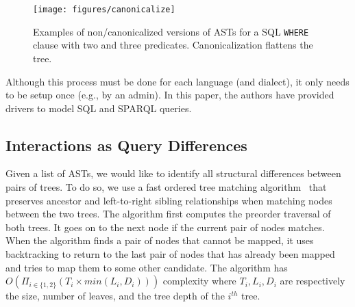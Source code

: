 \begin{figure}[b]
\centering
\texttt{[image: figures/canonicalize]}
\caption{Examples of non/canonicalized versions of ASTs for a SQL \texttt{WHERE} clause with two and three predicates. Canonicalization flattens the tree.}
\label{f:canonicalize}
\end{figure}


Although this process must be done for each language (and dialect), it only needs to be setup once (e.g., by an admin).  In this paper, the authors have provided drivers to model SQL and SPARQL queries.

\subsection{Interactions as Query Differences}
\label{sec:diff}
Given a list of ASTs, we would like to identify all structural differences
between pairs of trees.  To do so, we use a fast ordered tree matching
algorithm~\cite{bille2005survey,thomas2001introduction} that preserves ancestor
and left-to-right sibling relationships when matching nodes between the two
trees. The algorithm first computes the preorder traversal of both trees. It
goes on to the next node if the current pair of nodes matches. When the algorithm
finds a pair of nodes that cannot be mapped, it uses backtracking to return to
the last pair of nodes that has already been mapped and tries to map them to
some other candidate.  The algorithm has $O(\Pi_{i\in\{1,2\}} (T_i \times
min(L_i,D_i)))$ complexity where $T_i,L_i,D_i$ are respectively the size,
number of leaves, and the tree depth of the $i^{th}$ tree.

